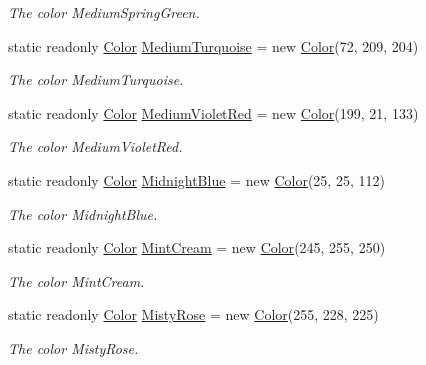 \begin{DoxyCompactItemize}
\begin{DoxyCompactList}\small\item\em The color Medium\-Spring\-Green. \end{DoxyCompactList}\item 
static readonly \hyperlink{struct_tri_devs_1_1_tri_engine_1_1_color}{Color} \hyperlink{struct_tri_devs_1_1_tri_engine_1_1_color_a83d738778fe9d11acc80d047de67d1d7}{Medium\-Turquoise} = new \hyperlink{struct_tri_devs_1_1_tri_engine_1_1_color}{Color}(72, 209, 204)
\begin{DoxyCompactList}\small\item\em The color Medium\-Turquoise. \end{DoxyCompactList}\item 
static readonly \hyperlink{struct_tri_devs_1_1_tri_engine_1_1_color}{Color} \hyperlink{struct_tri_devs_1_1_tri_engine_1_1_color_afbff3bffcc63a1e8e0de69e6720f3600}{Medium\-Violet\-Red} = new \hyperlink{struct_tri_devs_1_1_tri_engine_1_1_color}{Color}(199, 21, 133)
\begin{DoxyCompactList}\small\item\em The color Medium\-Violet\-Red. \end{DoxyCompactList}\item 
static readonly \hyperlink{struct_tri_devs_1_1_tri_engine_1_1_color}{Color} \hyperlink{struct_tri_devs_1_1_tri_engine_1_1_color_a03cb8fe929a53654129efd88e2d27c4e}{Midnight\-Blue} = new \hyperlink{struct_tri_devs_1_1_tri_engine_1_1_color}{Color}(25, 25, 112)
\begin{DoxyCompactList}\small\item\em The color Midnight\-Blue. \end{DoxyCompactList}\item 
static readonly \hyperlink{struct_tri_devs_1_1_tri_engine_1_1_color}{Color} \hyperlink{struct_tri_devs_1_1_tri_engine_1_1_color_a2fb96d140f0bb160ca57ae19fac60f51}{Mint\-Cream} = new \hyperlink{struct_tri_devs_1_1_tri_engine_1_1_color}{Color}(245, 255, 250)
\begin{DoxyCompactList}\small\item\em The color Mint\-Cream. \end{DoxyCompactList}\item 
static readonly \hyperlink{struct_tri_devs_1_1_tri_engine_1_1_color}{Color} \hyperlink{struct_tri_devs_1_1_tri_engine_1_1_color_a0869ccff63fc73cbf79f0453c8aae871}{Misty\-Rose} = new \hyperlink{struct_tri_devs_1_1_tri_engine_1_1_color}{Color}(255, 228, 225)
\begin{DoxyCompactList}\small\item\em The color Misty\-Rose. \end{DoxyCompactList}\item 

\end{DoxyCompactItemize}
